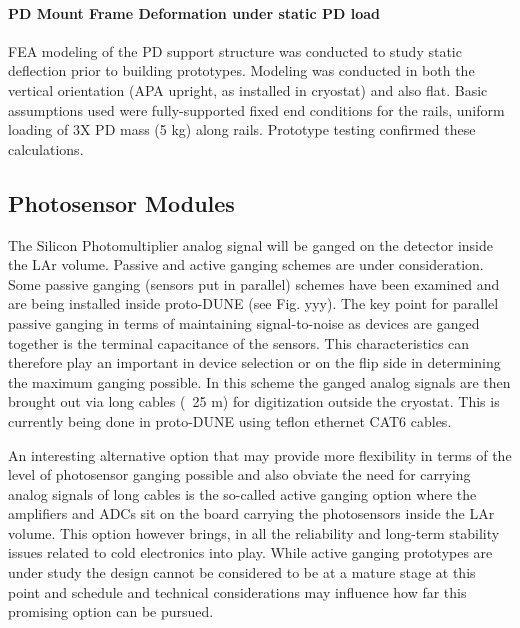\paragraph{PD Mount Frame Deformation under static PD load}

FEA modeling of the PD support structure was conducted to study static deflection 
prior to building prototypes.  Modeling was conducted in both the vertical
 orientation (APA upright, as installed in cryostat) and also flat.  
Basic assumptions used were fully-supported fixed end conditions for the rails, 
uniform loading of 3X PD mass (5 kg) along rails.  
Prototype testing confirmed these calculations.




\subsection{Photosensor Modules}
\label{sec:fdsp-pd-assy-psm}

The Silicon Photomultiplier analog signal will be ganged on the detector inside the
LAr volume. Passive and active ganging schemes are under consideration. Some passive
ganging (sensors put in parallel) schemes have been examined and are being installed inside
proto-DUNE (see Fig. yyy). The key point for parallel passive ganging in terms of 
maintaining signal-to-noise as devices are ganged together is the terminal capacitance of the 
sensors. This characteristics can therefore play an important in device selection or on
the flip side in determining the maximum ganging possible. In this scheme the 
ganged analog signals are then brought out via long cables (~25 m) for digitization outside
the cryostat. This is currently being done in proto-DUNE using teflon ethernet CAT6 cables.

An interesting alternative option that may provide more flexibility in terms of the level of
photosensor ganging possible and also obviate the need for carrying analog signals of long cables
is the so-called active ganging option where the amplifiers and ADCs sit on the board carrying 
the photosensors inside the LAr volume. This option however brings, in all the reliability and long-term
stability issues related to cold electronics into play. While active ganging prototypes are under study 
the design cannot be considered to be at a mature stage at this point and schedule and technical
considerations may influence how far this promising option can be pursued.

